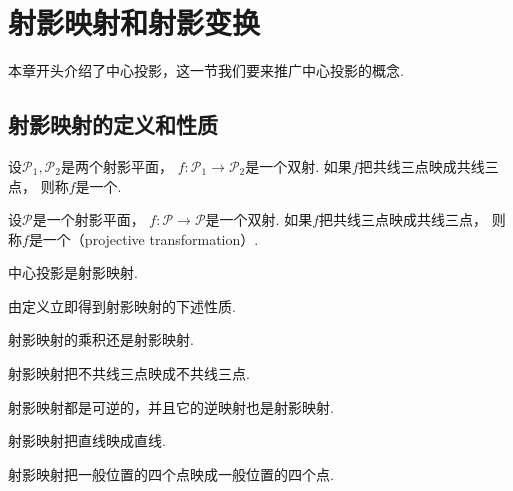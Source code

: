 \section{射影映射和射影变换}
本章开头介绍了中心投影，这一节我们要来推广中心投影的概念.

\subsection{射影映射的定义和性质}
\begin{definition}
设\(\mathscr{P}_1,\mathscr{P}_2\)是两个射影平面，
\(f\colon \mathscr{P}_1 \to \mathscr{P}_2\)是一个双射.
如果\(f\)把共线三点映成共线三点，
则称\(f\)是一个.
\end{definition}

\begin{definition}
设\(\mathscr{P}\)是一个射影平面，
\(f\colon \mathscr{P} \to \mathscr{P}\)是一个双射.
如果\(f\)把共线三点映成共线三点，
则称\(f\)是一个（projective transformation）.
\end{definition}

\begin{example}
中心投影是射影映射.
\end{example}

由定义立即得到射影映射的下述性质.
\begin{property}
射影映射的乘积还是射影映射.
\end{property}

\begin{property}
射影映射把不共线三点映成不共线三点.
\end{property}

\begin{property}
射影映射都是可逆的，并且它的逆映射也是射影映射.
\end{property}

\begin{property}
射影映射把直线映成直线.
\end{property}

\begin{property}
射影映射把一般位置的四个点映成一般位置的四个点.
\end{property}

